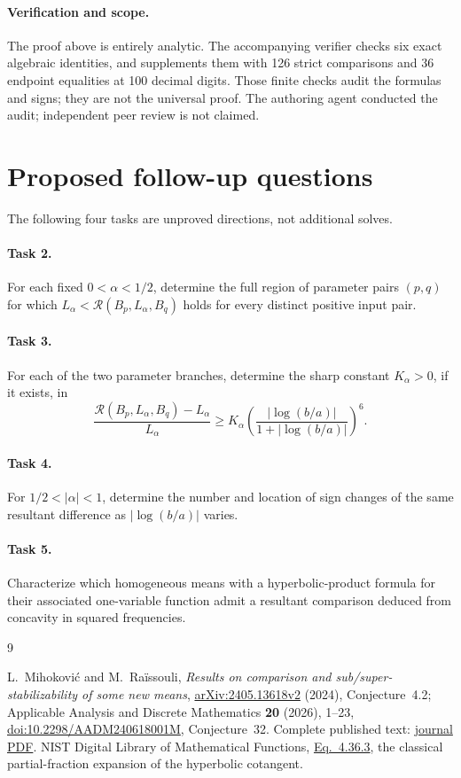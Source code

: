 \documentclass[11pt]{article}
\newcommand{\R}{\mathcal R}
\begin{document}
\paragraph{Verification and scope.}
The proof above is entirely analytic. The accompanying verifier checks
six exact algebraic identities, and supplements them with 126 strict
comparisons and 36 endpoint equalities at 100 decimal digits.
Those finite checks audit the formulas and signs; they are not the
universal proof. The authoring agent conducted the audit; independent
peer review is not claimed.

\section*{Proposed follow-up questions}
The following four tasks are unproved directions, not additional solves.
\paragraph{Task 2.}
For each fixed \(0<\alpha<1/2\), determine the full region of
parameter pairs \((p,q)\) for which \(L_\alpha<\R(B_p,L_\alpha,B_q)\)
holds for every distinct positive input pair.
\paragraph{Task 3.}
For each of the two parameter branches, determine the sharp
constant \(K_\alpha>0\), if it exists, in
\[
 \frac{\R(B_p,L_\alpha,B_q)-L_\alpha}{L_\alpha}
 \ge K_\alpha
 \left(\frac{|\log(b/a)|}{1+|\log(b/a)|}\right)^6.
\]
\paragraph{Task 4.}
For \(1/2<|\alpha|<1\), determine the number and location of sign changes
of the same resultant difference as \(|\log(b/a)|\) varies.
\paragraph{Task 5.}
Characterize which homogeneous means with a hyperbolic-product formula
for their associated one-variable function admit a resultant comparison
deduced from concavity in squared frequencies.

\begin{thebibliography}{9}
\raggedright
{}
L.~Mihokovi\'c and M.~Ra\"issouli,
\emph{Results on comparison and sub/super-stabilizability of some new means},
\href{https://arxiv.org/abs/2405.13618}{arXiv:2405.13618v2} (2024),
Conjecture~4.2; Applicable Analysis and Discrete Mathematics
\textbf{20} (2026), 1--23,
\href{https://doi.org/10.2298/AADM240618001M}{doi:10.2298/AADM240618001M},
Conjecture~32.
Complete published text:
\href{http://pefmath.etf.rs/vol20num1/AADM-Vol20-No1-1-23.pdf}{journal PDF}.
NIST Digital Library of Mathematical Functions,
\href{https://dlmf.nist.gov/4.36.E3}{Eq.~4.36.3},
the classical partial-fraction expansion of the hyperbolic cotangent.
\end{thebibliography}
\end{document}
